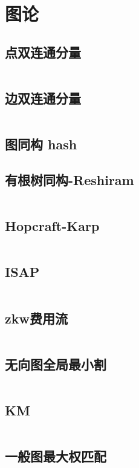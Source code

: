 \section{图论}
\subsection{点双连通分量}
\inputminted[breaklines]{cpp}{./graph-theory/vertex-biconnected-component.cpp}
\subsection{边双连通分量}
\inputminted[breaklines]{cpp}{./graph-theory/edge-biconnected-component.cpp}
\subsection{图同构 hash}

\subsection{有根树同构-Reshiram}
\inputminted[breaklines]{cpp}{./graph-theory/rooted-tree-isomorphism-Reshiram.cpp}
\subsection{Hopcraft-Karp}
\inputminted[breaklines]{cpp}{./graph-theory/Hopcraft-Karp.cpp}
\subsection{ISAP}
\inputminted[breaklines]{cpp}{./graph-theory/ISAP-maximum-flow.cpp}
\subsection{zkw费用流}
\inputminted[breaklines]{cpp}{./graph-theory/zkw-cost-flow.cpp}
\subsection{无向图全局最小割}
\inputminted[breaklines]{cpp}{./graph-theory/StoerWagner.cpp}
\subsection{KM}
\inputminted[breaklines]{cpp}{./graph-theory/KM-Algorithm.cpp}
\subsection{一般图最大权匹配}
\inputminted[breaklines]{cpp}{./graph-theory/general-graph-maximum-weight-matching.cpp}
